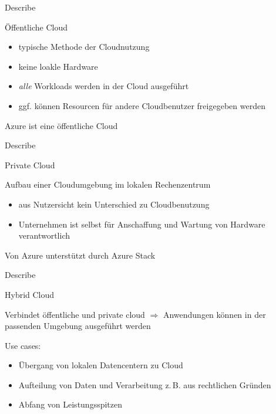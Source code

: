 \documentclass{scrartcl}
\newenvironment{flashcard}[2][]{%
    #1
    \vfill
    \centerline{\Large{#2}}
    \vfill
\newpage
}
{\newpage}
\begin{document}
    \begin{flashcard}[Describe]{Öffentliche Cloud}
        \begin{itemize}
            \item typische Methode der Cloudnutzung
            \item keine loakle Hardware
            \item \emph{alle} Workloads werden in der Cloud ausgeführt
            \item ggf. können Resourcen für andere Cloudbenutzer freigegeben werden
        \end{itemize}

        \vspace{5mm}
        Azure ist eine öffentliche Cloud
    \end{flashcard}

    \begin{flashcard}[Describe]{Private Cloud}
        Aufbau einer Cloudumgebung im lokalen Rechenzentrum

        \begin{itemize}
            \item aus Nutzersicht kein Unterschied zu Cloudbenutzung
            \item Unternehmen ist selbst für Anschaffung und Wartung von Hardware verantwortlich
        \end{itemize}

        \vspace{5mm}
        Von Azure unterstützt durch Azure Stack

    \end{flashcard}

    \begin{flashcard}[Describe]{Hybrid Cloud}
        Verbindet öffentliche und private cloud\newline
        $\Rightarrow$ Anwendungen können in der passenden Umgebung ausgeführt werden

        \vspace{5mm}
        Use cases:
        \begin{itemize}
            \item Übergang von lokalen Datencentern zu Cloud
            \item Aufteilung von Daten und Verarbeitung z.\,B. aus rechtlichen Gründen
            \item Abfang von Leistungsspitzen
        \end{itemize}

    \end{flashcard}
\end{document}
